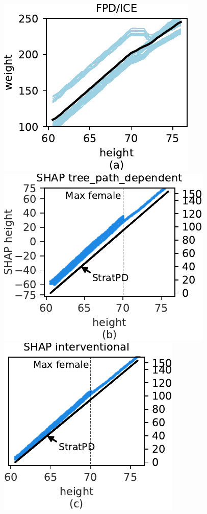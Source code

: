 \documentclass[]{article} %
\begin{document}
\begin{figure}[!htbp]
\begin{center}
\includegraphics[scale=0.55]{images/height_vs_weight_pdp.pdf}~\includegraphics[scale=0.55]{images/weight_tree_path_dependent_shap.pdf}
\includegraphics[scale=0.55]{images/weight_interventional_shap.pdf}~

\end{center}
\end{figure}
\end{document}
